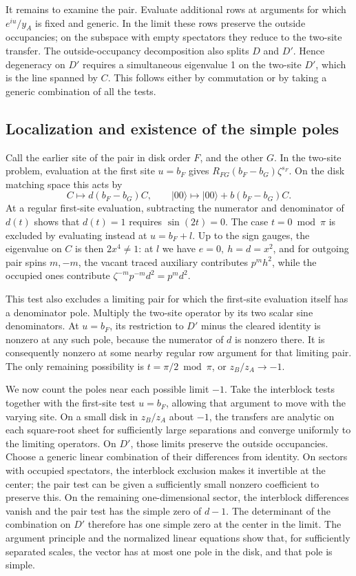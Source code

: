 It remains to examine the pair. Evaluate additional rows at arguments for which \(e^{iu}/y_A\) is fixed and generic. In the limit these rows preserve the outside occupancies; on the subspace with empty spectators they reduce to the two-site transfer. The outside-occupancy decomposition also splits \(D\) and \(D'\). Hence degeneracy on \(D'\) requires a simultaneous eigenvalue 1 on the two-site \(D'\), which is the line spanned by \(C\). This follows either by commutation or by taking a generic combination of all the tests.

\subsection{Localization and existence of the simple poles}

Call the earlier site of the pair in disk order \(F\), and the other \(G\). In the two-site problem, evaluation at the first site \(u=b_F\) gives \(R_{FG}(b_F-b_G)\zeta^{s_F}\). On the disk matching space this acts by
\[
 C\mapsto d(b_F-b_G)C,\qquad |00\rangle\mapsto |00\rangle+b(b_F-b_G) C.
\]
At a regular first-site evaluation, subtracting the numerator and denominator of \(d(t)\) shows that \(d(t)=1\) requires \(\sin(2t)=0\). The case \(t=0\bmod\pi\) is excluded by evaluating instead at \(u=b_F+l\). Up to the sign gauges, the eigenvalue on \(C\) is then \(2x^4\ne1\): at \(l\) we have \(e=0,\ h=d=x^2\), and for outgoing pair spins \(m,-m\), the vacant traced auxiliary contributes \(p^m h^2\), while the occupied ones contribute \(\zeta^{-m}p^{-m}d^2=p^m d^2\).

This test also excludes a limiting pair for which the first-site evaluation itself has a denominator pole. Multiply the two-site operator by its two scalar sine denominators. At \(u=b_F\), its restriction to \(D'\) minus the cleared identity is nonzero at any such pole, because the numerator of \(d\) is nonzero there. It is consequently nonzero at some nearby regular row argument for that limiting pair. The only remaining possibility is \(t=\pi/2\bmod\pi\), or \(z_B/z_A\to-1\).

We now count the poles near each possible limit \(-1\). Take the interblock tests together with the first-site test \(u=b_F\), allowing that argument to move with the varying site. On a small disk in \(z_B/z_A\) about \(-1\), the transfers are analytic on each square-root sheet for sufficiently large separations and converge uniformly to the limiting operators. On \(D'\), those limits preserve the outside occupancies. Choose a generic linear combination of their differences from identity. On sectors with occupied spectators, the interblock exclusion makes it invertible at the center; the pair test can be given a sufficiently small nonzero coefficient to preserve this. On the remaining one-dimensional sector, the interblock differences vanish and the pair test has the simple zero of \(d-1\). The determinant of the combination on \(D'\) therefore has one simple zero at the center in the limit. The argument principle and the normalized linear equations show that, for sufficiently separated scales, the vector has at most one pole in the disk, and that pole is simple.

